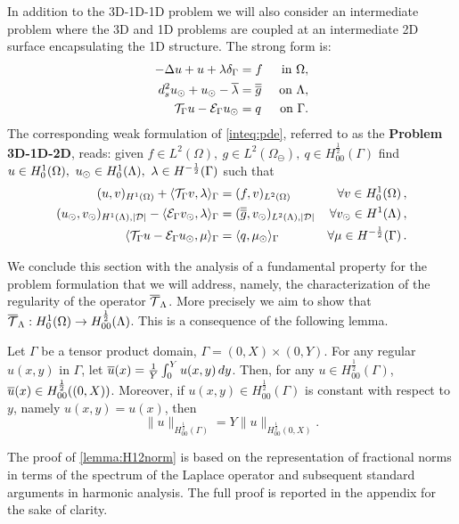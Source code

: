 \documentclass[r]{siamart171218}
\newcommand{\paoloold}[1]{{\color{black}#1}}
\begin{document}
In addition to the 3D-1D-1D problem we will also consider an 
intermediate problem where the 3D and 1D problems are coupled at an
intermediate 2D surface  encapsulating the 1D structure. The strong form is:  
\paoloold{
\begin{subequations}
\label{inteq:pde}
\begin{align}
\label{inteq:pde1}
  -\Delta u + u + \lambda \delta_{\Gamma} &= f &\mbox{ in } \Omega,\\ 
\label{inteq:pde2}
 d_s^2 \ud + \ud -  \avrc{\lambda} &= \avrd{g} &\mbox{ on } \Lambda,\\
\label{inteq:coupling}
\mathcal{T}_\Gamma u - \mathcal{E}_\Gamma \ud  &=  q &\mbox{ on } \Gamma . 
\end{align}
\end{subequations}
}
The corresponding weak formulation of \eqref{inteq:pde}, referred to as the \textbf{Problem 3D-1D-2D}, reads: 
\paoloold{given $f\in L^2(\Omega), \ g \in L^2(\Omega_{\ominus}), \ q \in H^\frac12_{00}(\Gamma)$}
find $u \in H^1_0(\Omega), \ u_{\odot} \in H^1_0(\Lambda), \ \lambda \in H^{-\frac 1 2}(\Gamma ) $ such that
\begin{subequations}\label{eq:problem1}
\begin{align}
(u,v)_{H^1(\Omega)} + \langle \trace v, \lambda \rangle_\Gamma &= (f,v)_{L^2(\Omega)} &\forall v \in H^1_0(\Omega)\, ,
\\
 (\ud,\vd)_{H^1(\Lambda),|\D|}  -  \langle \ext \vd, \lambda \rangle_\Gamma
&=  (\avrd{g},\vd)_{L^2(\Lambda),|\D|} &\forall\vd \in H^1(\Lambda)\, ,
\\
\langle \trace u - \ext \ud , \mu \rangle_\Gamma 
&= \paoloold{\langle q,\md\rangle_\Gamma} 
&\forall \mu \in H^{-\frac 1 2}(\Gamma)\,.
\end{align}
\end{subequations}

We conclude this section with the analysis of a fundamental property for the problem formulation that we will address, namely, the characterization of the regularity of the operator ${\overline{\mathcal{T}}_\Lambda}$. More precisely we aim to show that ${\overline{\mathcal{T}}_\Lambda}: H^1_0(\Omega) \rightarrow H^\frac 1 2_{00}(\Lambda)$.
This is a consequence of the following lemma.

\begin{lemma}\label{lemma:H12norm}
Let $\Gamma$ be a tensor product domain, $\Gamma= (0,X) \times (0,Y)$. For any regular $u(x,y)$ in $\Gamma$, let $\overline{u}(x)=\frac 1Y \int _0^Y u(x,y)\, dy$. Then, for any $u\in H_{00}^{\frac 12}(\Gamma)$, $\overline{u}(x)\in H_{00}^{\frac 12}((0,X))$. 
Moreover, if $u(x,y)\in H^{\frac 12}_{00}(\Gamma)$ is constant with respect to $y$, namely $u(x,y)=u(x)$, then 
\begin{equation*}
\|u\|_{H^{\frac 12}_{00}(\Gamma)}=Y \|u\|_{H^{\frac 12}_{00}(0,X)}.
\end{equation*}
\end{lemma}
The proof of \ref{lemma:H12norm} is based on the representation of fractional norms in terms of the spectrum of the Laplace operator and subsequent standard arguments in harmonic analysis. The full proof is reported in the appendix for the sake of clarity.
\end{document}
